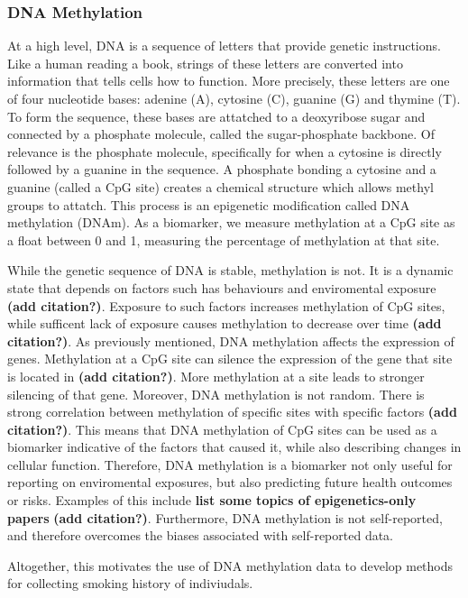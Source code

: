 \documentclass{article}
\begin{document}
\subsubsection{DNA Methylation}
At a high level, DNA is a sequence of letters that provide genetic instructions. Like a human reading a book, strings of these letters are converted into information that tells cells how to function. More precisely, these letters are one of four nucleotide bases: adenine (A), cytosine (C), guanine (G) and thymine (T). To form the sequence, these bases are attatched to a deoxyribose sugar and connected by a phosphate molecule, called the sugar-phosphate backbone. Of relevance is the phosphate molecule, specifically for when a cytosine is directly followed by a guanine in the sequence. A phosphate bonding a cytosine and a guanine (called a CpG site) creates a chemical structure which allows methyl groups to attatch. This process is an epigenetic modification called DNA methylation (DNAm). As a biomarker, we measure methylation at a CpG site as a float between 0 and 1, measuring the percentage of methylation at that site.

While the genetic sequence of DNA is stable, methylation is not. It is a dynamic state that depends on factors such has behaviours and enviromental exposure \textbf{(add citation?)}. Exposure to such factors increases methylation of CpG sites, while sufficent lack of exposure causes methylation to decrease over time \textbf{(add citation?)}. As previously mentioned, DNA methylation affects the expression of genes. Methylation at a CpG site can silence the expression of the gene that site is located in \textbf{(add citation?)}. More methylation at a site leads to stronger silencing of that gene. Moreover, DNA methylation is not random. There is strong correlation between methylation of specific sites with specific factors \textbf{(add citation?)}. This means that DNA methylation of CpG sites can be used as a biomarker indicative of the factors that caused it, while also describing changes in cellular function. Therefore, DNA methylation is a biomarker not only useful for reporting on enviromental exposures, but also predicting future health outcomes or risks. Examples of this include \textbf{list some topics of epigenetics-only papers} \textbf{(add citation?)}. Furthermore, DNA methylation is not self-reported, and therefore overcomes the biases associated with self-reported data. 

Altogether, this motivates the use of DNA methylation data to develop methods for collecting smoking history of indiviudals. 
\end{document}
